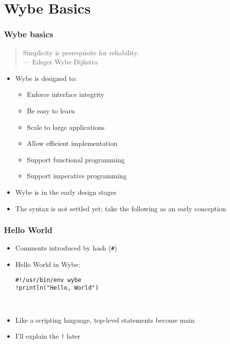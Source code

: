 \documentclass[12pt]{beamer}
\begin{document}
\section{Wybe Basics}

\begin{frame}
\frametitle{Wybe basics}
\begin{quotation}
Simplicity is prerequisite for reliability. \\
\hspace*{3em}--- Edsger Wybe Dijkstra
\end{quotation}

\begin{itemize}
\item Wybe is designed to:
  \begin{itemize}
  \item Enforce interface integrity
  \item Be easy to learn
  \item Scale to large applications
  \item Allow efficient implementation
  \item Support functional programming
  \item Support imperative programming
  \end{itemize}
\item Wybe is in the early design stages
\item The syntax is not settled yet; take the following as an early conception
\end{itemize}
\end{frame}


\begin{frame}
\frametitle{Hello World}
\begin{itemize}
\item Comments introduced by hash (\texttt{\#})
\item Hello World in Wybe: \\[3ex]
\begin{alltt}
    \hspace*{5em}\texttt{\#!/usr/bin/env wybe}\\
    \hspace*{5em}\texttt{!println("Hello, World")}
\end{alltt} \\[3ex]
\item Like a scripting language, top-level statements become main
\item I'll explain the \texttt{!} later
\end{itemize}
\end{frame}
\end{document}

